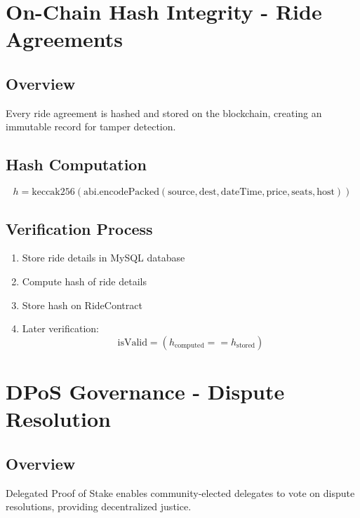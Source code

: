 \documentclass[12pt]{report}
\theoremstyle{plain}
\theoremstyle{definition}
\theoremstyle{remark}
\begin{document}
\section{On-Chain Hash Integrity - Ride Agreements}

\subsection{Overview}

Every ride agreement is hashed and stored on the blockchain, creating an immutable record for tamper detection.

\subsection{Hash Computation}

\begin{equation}
h = \text{keccak256}(\text{abi.encodePacked}(
    \text{source}, \text{dest}, \text{dateTime}, \text{price}, \text{seats}, \text{host}
))
\end{equation}

\subsection{Verification Process}

\begin{enumerate}
    \item Store ride details in MySQL database
    \item Compute hash of ride details
    \item Store hash on RideContract
    \item Later verification:
    \begin{equation}
    \text{isValid} = (h_{\text{computed}} == h_{\text{stored}})
    \end{equation}
\end{enumerate}

\section{DPoS Governance - Dispute Resolution}

\subsection{Overview}

Delegated Proof of Stake enables community-elected delegates to vote on dispute resolutions, providing decentralized justice.
\end{document}
